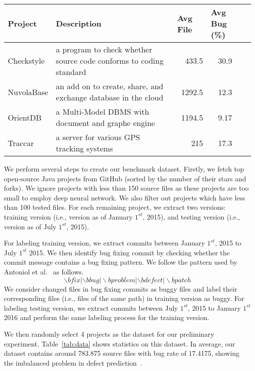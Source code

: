 \begin{table*}[t!]
	\centering
	\caption{Description of four popular software projects.}
	\begin{tabular}{|l|l|r|c|c|}
		\hline
		Project & \multicolumn{1}{l|}{Description}  & \multicolumn{1}{l|}{Avg File} & \multicolumn{1}{l|}{Avg Bug (\%)} \\
		\hline
		\hline
		Checkstyle  &  a program to check whether source code conforms to coding standard & 433.5 & 30.9 \\
		NuvolaBase &  an add on to create, share, and exchange database in the cloud     & 1292.5 & 12.3 \\
		OrientDB &  a Multi-Model DBMS with document and graphe engine  & 1194.5 & 9.17 \\
		Traccar &  a server for various GPS tracking systems & 215   & 17.3 \\
		\hline
	\end{tabular}%
	\label{tab:data}%
\end{table*}%

We perform several steps to create our benchmark dataset. Firstly, we fetch top open-source Java projects from GitHub (sorted by the number of their stars and forks). We ignore projects with less than 150 source files as these projects are too small to employ deep neural network. We also filter out projects which have less than 100 tested files. For each remaining project, we extract two versions: training version (i.e., version as of January $1^{st}$, 2015), and testing version (i.e., version as of July $1^{st}$, 2015). 

For labeling training version, we extract commits between January $1^{st}$, 2015 to July $1^{st}$ 2015. We then identify bug fixing commit by checking whether the commit message contains a bug fixing pattern. We follow the pattern used by Antoniol et al.~\cite{antoniol2008bug} as follows.
\[
\backslash bfix|\backslash bbug|\backslash bproblem|\backslash bdefect|\backslash bpatch
\]
We consider changed files in bug fixing commits as buggy files and label their corresponding files (i.e., files of the same path) in training version as buggy. For labeling testing version, we extract commits between July $1^{st}$, 2015 to January $1^{st}$ 2016 and perform the same labeling process for the training version.

We then randomly select 4 projects as the dataset for our preliminary experiment. Table~\ref{tab:data} shows statistics on this dataset. In average, our dataset contains around 783.875 source files with bug rate of 17.4175, showing the imbalanced problem in defect prediction~\cite{wang2013using, khoshgoftaar2010attribute}.

